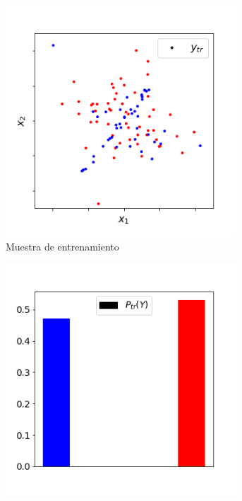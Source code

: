 \begin{figure}[H]
    \centering
    \begin{subfigure}[t]{0.36\textwidth}
        \centering
        \includegraphics[width=0.95\textwidth]{../plots_teoria/cambios_train_scatterplot.png}
        \caption{Muestra de entrenamiento}\label{cambios:datos_tr}
    \end{subfigure}
    \hfill
    \begin{subfigure}[t]{0.36\textwidth}
        \centering
        \includegraphics[width=0.95\textwidth]{../plots_teoria/cambios_train_barplot.png}

\end{subfigure}
\end{figure}
